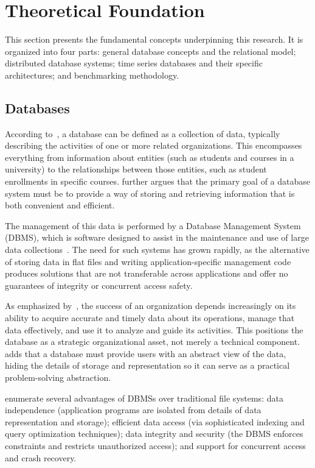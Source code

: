 \section{Theoretical Foundation}
\label{sec:theoretical}

This section presents the fundamental concepts underpinning this research. It is organized
into four parts: general database concepts and the relational model; distributed database
systems; time series databases and their specific architectures; and benchmarking methodology.

\subsection{Databases}

According to~\cite{Ramakrishnan2003}, a database can be defined as a collection of data,
typically describing the activities of one or more related organizations. This encompasses
everything from information about entities (such as students and courses in a university)
to the relationships between those entities, such as student enrollments in specific courses.
\cite{Silberschatz2020} further argues that the primary goal of a database system must be to
provide a way of storing and retrieving information that is both convenient and efficient.

The management of this data is performed by a Database Management System (DBMS), which is
software designed to assist in the maintenance and use of large data collections~\citep{Ramakrishnan2003}.
The need for such systems has grown rapidly, as the alternative of storing data in flat files
and writing application-specific management code produces solutions that are not transferable
across applications and offer no guarantees of integrity or concurrent access safety.

As emphasized by~\cite{Ramakrishnan2003}, the success of an organization depends increasingly
on its ability to acquire accurate and timely data about its operations, manage that data
effectively, and use it to analyze and guide its activities. This positions the database as a
strategic organizational asset, not merely a technical component. \cite{Silberschatz2020} adds
that a database must provide users with an abstract view of the data, hiding the details of
storage and representation so it can serve as a practical problem-solving abstraction.

\cite{Ramakrishnan2003} enumerate several advantages of DBMSs over traditional file systems:
data independence (application programs are isolated from details of data representation and
storage); efficient data access (via sophisticated indexing and query optimization techniques);
data integrity and security (the DBMS enforces constraints and restricts unauthorized access);
and support for concurrent access and crash recovery.


